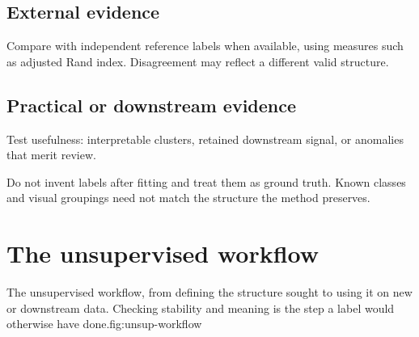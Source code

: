 \subsection{External evidence}
Compare with independent reference labels when available, using measures such as adjusted Rand index. Disagreement may reflect a different valid structure.

\subsection{Practical or downstream evidence}
Test usefulness: interpretable clusters, retained downstream signal, or anomalies that merit review.

\begin{pitfall}
Do not invent labels after fitting and treat them as ground truth. Known classes and visual groupings need not match the structure the method preserves.
\end{pitfall}

\section{The unsupervised workflow}

\begin{utpfig}{The unsupervised workflow, from defining the structure sought to using it on new or downstream data. Checking stability and meaning is the step a label would otherwise have done.}{fig:unsup-workflow}
\end{utpfig}

